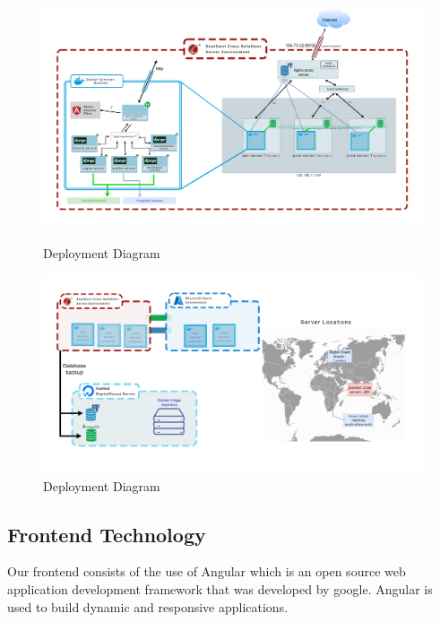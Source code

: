 \documentclass[12pt]{article}
\begin{document}
    \begin{figure}[ht]
        \begin{center}
            \includegraphics[width=1\textwidth]{images/domain-pulse-deployment.drawio.png}
        \end{center}
        \caption{Deployment Diagram}

        \begin{center}
            \includegraphics[width=1\textwidth]{images/domain-pulse-deployment-p2.png}
        \end{center}
        \caption{Deployment Diagram}
    \end{figure}

    \newpage

\subsection{Frontend Technology}
Our frontend consists of the use of Angular which is an open source web application development framework that was developed by google. Angular is used to build dynamic and responsive applications.
\end{document}
